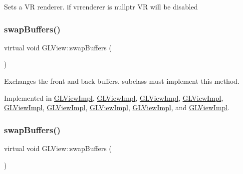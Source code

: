 Sets a VR renderer. if {\ttfamily vrrenderer} is {\ttfamily nullptr} VR will be disabled \mbox{\label{classGLView_a8868ba73f19216f5f6c8dbcc1a7c9bb4}} 
\subsubsection{\texorpdfstring{swap\+Buffers()}{swapBuffers()}\hspace{0.1cm}{\footnotesize\ttfamily [1/2]}}
{\footnotesize\ttfamily virtual void G\+L\+View\+::swap\+Buffers (\begin{DoxyParamCaption}{ }\end{DoxyParamCaption})\hspace{0.3cm}{\ttfamily [pure virtual]}}

Exchanges the front and back buffers, subclass must implement this method. 

Implemented in \hyperlink{classGLViewImpl_afe7883d151fd7d92d19d3359dc33e8b9}{G\+L\+View\+Impl}, \hyperlink{classGLViewImpl_ab434675d26eb367ae74f9533c34d2ca7}{G\+L\+View\+Impl}, \hyperlink{classGLViewImpl_ab434675d26eb367ae74f9533c34d2ca7}{G\+L\+View\+Impl}, \hyperlink{classGLViewImpl_ab434675d26eb367ae74f9533c34d2ca7}{G\+L\+View\+Impl}, \hyperlink{classGLViewImpl_ab434675d26eb367ae74f9533c34d2ca7}{G\+L\+View\+Impl}, \hyperlink{classGLViewImpl_afe7883d151fd7d92d19d3359dc33e8b9}{G\+L\+View\+Impl}, \hyperlink{classGLViewImpl_a29bbe397ac0cd3793fa0815b34cd37aa}{G\+L\+View\+Impl}, \hyperlink{classGLViewImpl_a29bbe397ac0cd3793fa0815b34cd37aa}{G\+L\+View\+Impl}, and \hyperlink{classGLViewImpl_a29bbe397ac0cd3793fa0815b34cd37aa}{G\+L\+View\+Impl}.

\mbox{\label{classGLView_a8868ba73f19216f5f6c8dbcc1a7c9bb4}} 
\subsubsection{\texorpdfstring{swap\+Buffers()}{swapBuffers()}\hspace{0.1cm}{\footnotesize\ttfamily [2/2]}}
{\footnotesize\ttfamily virtual void G\+L\+View\+::swap\+Buffers (\begin{DoxyParamCaption}{ }\end{DoxyParamCaption})\hspace{0.3cm}{\ttfamily [pure virtual]}}

